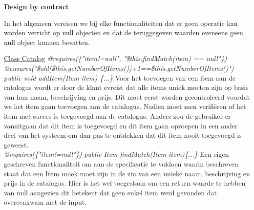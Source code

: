 \documentclass{article}
\begin{document}
\newpage
\maketitle
\noindent
\textbf{Design by contract} \newline
\newline

\maketitle
\noindent
In het algemeen vereisen we bij elke functionaliteiten dat er geen operatie kan worden verricht op null objecten en dat de teruggegeven waarden eveneens geen null object kunnen bevatten.\newline
\newline

\noindent
\underline{Class Catalog}\newline
\textit{@requires(\{"item!=null", "\$this.findMatch(item) == null"\})}\newline
\textit{@ensures("\$old(\$this.getNumberOfItems())+1==\$this.getNumberOfItems()")}\newline
\textit{public void addItem(Item item) \{...\}}\newline
Voor het toevoegen van een item aan de catalogus wordt er door de klant evreist dat alle items uniek moeten zijn op basis van hun naam, beschrijving en prijs. Dit moet eerst worden gecontroleerd voordat we het item gaan toevoegen aan de catalogus. Nadien moet men verifi\"{e}ren of het item met succes is toegevoegd aan de catalogus. Anders zou de gebruiker er vanuitgaan dat dit item is toegevoegd en dit item gaan oproepen in een ander deel van het systeem om dan pas te ontdekken dat dit item nooit toegevoegd is geweest.\\

\noindent
\textit{@requires(\{"item!=null"\})}\newline
\textit{public Item findMatch(Item item)\{...\}}\newline
Een eigen geschreven functionaliteit om aan de specificatie te voldoen waarin beschreven staat dat een Item uniek moet zijn in de zin van een unieke naam, beschrijving en prijs in de catalogus. Hier is het wel toegestaan om een return waarde te hebben van null aangezien dit betekent dat geen enkel item werd gevonden dat overeenkwam met de input. \\

\newpage
\end{document}
